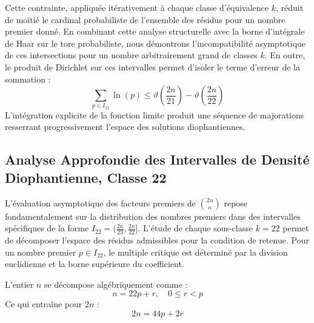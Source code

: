 \documentclass[12pt,a4paper]{article}
\begin{document}
    Cette contrainte, appliquée itérativement à chaque classe d'équivalence $k$, réduit de moitié le cardinal probabiliste de l'ensemble des résidus pour un nombre premier donné.
    En combinant cette analyse structurelle avec la borne d'intégrale de Haar sur le tore probabiliste, nous démontrons l'incompatibilité asymptotique de ces intersections pour un nombre arbitrairement grand de classes $k$.
    En outre, le produit de Dirichlet sur ces intervalles permet d'isoler le terme d'erreur de la sommation :
    \begin{equation}
    \sum_{p \in I_21} \ln(p) \le \vartheta\left(\frac{2n}{21}\right) - \vartheta\left(\frac{2n}{22}\right)
    \end{equation}
    L'intégration explicite de la fonction limite produit une séquence de majorations resserrant progressivement l'espace des solutions diophantiennes.
    
    \newpage
    \subsection{Analyse Approfondie des Intervalles de Densité Diophantienne, Classe 22}
    L'évaluation asymptotique des facteurs premiers de $\binom{2n}{n}$ repose fondamentalement sur la distribution des nombres premiers dans des intervalles spécifiques de la forme $I_22 = (\frac{2n}{23}, \frac{2n}{22}]$.
    L'étude de chaque sous-classe $k = 22$ permet de décomposer l'espace des résidus admissibles pour la condition de retenue.
    Pour un nombre premier $p \in I_22$, le multiple critique est déterminé par la division euclidienne et la borne supérieure du coefficient.

    L'entier $n$ se décompose algébriquement comme :
    \begin{equation}
    n = 22 p + r, \quad 0 \le r < p
    \end{equation}
    Ce qui entraîne pour $2n$ :
    \begin{equation}
    2n = 44 p + 2r
    \end{equation}
\end{document}
